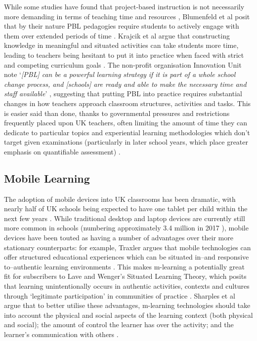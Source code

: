 \documentclass[,hyphens]{sigchi}
\begin{document}
While some studies have found that project-based instruction is not necessarily more demanding in terms of teaching time and resources \cite{Al-Balushi2014}, Blumenfeld et al posit that by their nature PBL pedagogies require students to actively engage with them over extended periods of time \cite{Blumenfeld1991}. Krajcik et al argue that constructing knowledge in meaningful and situated activities can take students more time, leading to teachers being hesitant to put it into practice when faced with strict and competing curriculum goals \cite{Krajcik2006}. The non-profit organisation Innovation Unit note `\textit{[PBL] can be a powerful learning strategy if it is part of a whole school change process, and [schools] are ready and able to make the necessary time and staff available}' \cite{InnovationUnit2016}, suggesting that putting PBL into practice requires substantial changes in how teachers approach classroom structures, activities and tasks. This is easier said than done, thanks to governmental pressures and restrictions frequently placed upon UK teachers, often limiting the amount of time they can dedicate to particular topics and experiential learning methodologies which don't target given examinations (particularly in later school years, which place greater emphasis on quantifiable assessment) \cite{Ofsted2018}.

\subsection{Mobile Learning}
The adoption of mobile devices into UK classrooms has been dramatic, with nearly half of UK schools being expected to have one tablet per child within the next few years \cite{BritishEducationalSuppliersAssociation2015}. While traditional desktop and laptop devices are currently still more common in schools (numbering approximately 3.4 million in 2017 \cite{BritishEducationalSuppliersAssociation2017}), mobile devices have been touted as having a number of advantages over their more stationary counterparts: for example, Traxler argues that mobile technologies can offer structured educational experiences which can be situated in--and responsive to--authentic learning environments \cite{Traxler2011}. This makes m-learning a potentially great fit for subscribers to Lave and Wenger's Situated Learning Theory, which posits that learning unintentionally occurs in authentic activities, contexts and cultures through `legitimate participation' in communities of practice \cite{Lave1991}. Sharples et al argue that to better utilise these advantages, m-learning technologies should take into account the physical and social aspects of the learning context (both physical and social); the amount of control the learner has over the activity; and the learner's communication with others \cite{Sharples2007}.
\end{document}
